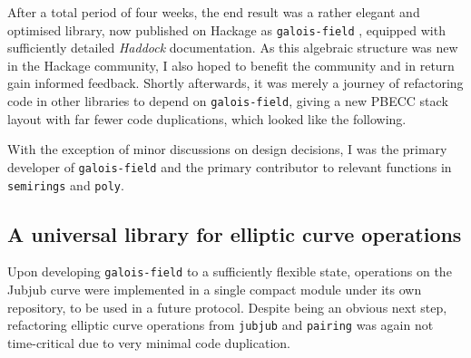 \documentclass[11pt]{article}
\begin{document}
After a total period of four weeks, the end result was a rather elegant and optimised library, now published on Hackage as \texttt{galois-field} \cite{galois-field}, equipped with sufficiently detailed \emph{Haddock} documentation. As this algebraic structure was new in the Hackage community, I also hoped to benefit the community and in return gain informed feedback. Shortly afterwards, it was merely a journey of refactoring code in other libraries to depend on \texttt{galois-field}, giving a new PBECC stack layout with far fewer code duplications, which looked like the following.
\begin{center}
\end{center}

With the exception of minor discussions on design decisions, I was the primary developer of \texttt{galois-field} and the primary contributor to relevant functions in \texttt{semirings} and \texttt{poly}.

\pagebreak

\subsection{A universal library for elliptic curve operations}

Upon developing \texttt{galois-field} to a sufficiently flexible state, operations on the Jubjub curve were implemented in a single compact module under its own repository, to be used in a future protocol. Despite being an obvious next step, refactoring elliptic curve operations from \texttt{jubjub} and \texttt{pairing} was again not time-critical due to very minimal code duplication.
\end{document}
